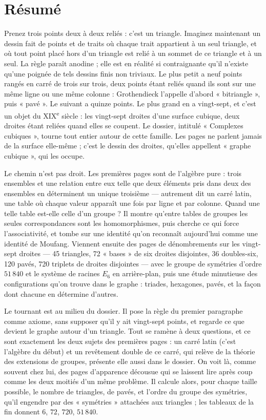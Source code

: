 \documentclass[11pt,a4paper]{article}
\begin{document}
\section*{Résumé}

\begin{resume}
Prenez trois points deux à deux reliés : c'est un triangle. Imaginez
maintenant un dessin fait de points et de traits où chaque trait appartient
à un seul triangle, et où tout point placé hors d'un triangle est relié à un
sommet de ce triangle et à un seul. La règle paraît anodine ; elle est en
réalité si contraignante qu'il n'existe qu'une poignée de tels dessins finis
non triviaux. Le plus petit a neuf points rangés en carré de trois sur trois,
deux points étant reliés quand ils sont sur une même ligne ou une même
colonne : Grothendieck l'appelle d'abord « bitriangle », puis « pavé ». Le
suivant a quinze points. Le plus grand en a vingt-sept, et c'est un objet du
XIX\textsuperscript{e} siècle : les vingt-sept droites d'une surface cubique,
deux droites étant reliées quand elles se coupent. Le dossier, intitulé
« Complexes cubiques », tourne tout entier autour de cette famille. Les
pages ne parlent jamais de la surface elle-même ; c'est le dessin des droites,
qu'elles appellent « graphe cubique », qui les occupe.

Le chemin n'est pas droit. Les premières pages sont de l'algèbre pure : trois
ensembles et une relation entre eux telle que deux éléments pris dans deux des
ensembles en déterminent un unique troisième --- autrement dit un carré latin,
une table où chaque valeur apparaît une fois par ligne et par colonne. Quand
une telle table est-elle celle d'un groupe ? Il montre qu'entre tables de
groupes les seules correspondances sont les homomorphismes, puis cherche ce
qui force l'associativité, et tombe sur une identité qu'on reconnaît
aujourd'hui comme une identité de Moufang. Viennent ensuite des pages de
dénombrements sur les vingt-sept droites --- 45 triangles, 72 « bases » de six
droites disjointes, 36 doubles-six, 120 pavés, 720 triplets de droites
disjointes --- avec le groupe de symétries d'ordre $51\,840$ et le système de
racines $E_6$ en arrière-plan, puis une étude minutieuse des configurations
qu'on trouve dans le graphe : triades, hexagones, pavés, et la façon dont
chacune en détermine d'autres.

Le tournant est au milieu du dossier. Il pose la règle du premier paragraphe
comme axiome, sans supposer qu'il y ait vingt-sept points, et regarde ce que
devient le graphe autour d'un triangle. Tout se ramène à deux questions, et
ce sont exactement les deux sujets des premières pages : un carré latin
(c'est l'algèbre du début) et un revêtement double de ce carré, qui relève de
la théorie des extensions de groupes, présente elle aussi dans le dossier. On
voit là, comme souvent chez lui, des pages d'apparence décousue qui se
laissent lire après coup comme les deux moitiés d'un même problème. Il calcule
alors, pour chaque taille possible, le nombre de triangles, de pavés, et
l'ordre du groupe des symétries, qu'il engendre par des « symétries » attachées
aux triangles ; les tableaux de la fin donnent $6$, $72$, $720$, $51\,840$.


\end{resume}
\end{document}
